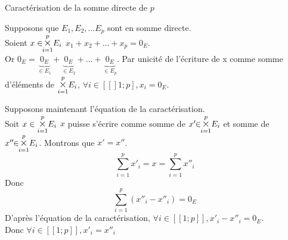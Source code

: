 \documentclass{article}
\renewenvironment{question_kholle}[2][ ]
{
	\subsection{\texorpdfstring{#2}{}}
	\notblank{#1}
	{
		\noindent #1
		\bigbreak
	}
	{}
	\begin{proof}
}
{
	\end{proof}
}
\begin{document}
		{Caractérisation de la somme directe de $p$ \sevs}

		Supposons que $E_1, E_2, \ldots E_p$ sont en somme directe. \\
		Soient $x \in \!\! \overset{p}{\underset{i=1}{\mathlarger{\mathlarger{\times}}}} E_i$ \fqs \tqs $x_1 + x_2 + \ldots + x_p = 0_E$. \\
		Or $0_E = \underbrace{0_E}_{\in E_1} + \underbrace{0_E}_{\in E_2} + \ldots + \underbrace{0_E}_{\in E_p}$.
		Par unicité de l'écriture de x comme somme d'éléments de $\overset{p}{\underset{i=1}{\mathlarger{\mathlarger{\times}}}} E_i$, $\forall i \in [\![]1;p\!], x_i = 0_E$.

		Supposons maintenant l'équation de la caractérisation. \\
		Soit $x \in \overset{p}{\underset{i=1}{\mathlarger{\mathlarger{\times}}}} E_i$ \tq $x$ puisse s'écrire comme somme de $x' \!\! \in \!\! \overset{p}{\underset{i=1}{\mathlarger{\mathlarger{\times}}}} E_i$ et somme de $x'' \!\! \in \!\! \overset{p}{\underset{i=1}{\mathlarger{\mathlarger{\times}}}} E_i$. Montrons que $x' = x''$.
		\begin{equation*}
			\sum_{i=1}^{p} x'_i = x = \sum_{i=1}^{p} x''_i
		\end{equation*}
		Donc
		\begin{equation*}
			\sum_{i=1}^{p} \left( x''_i -x''_i \right) = 0_E
		\end{equation*}
		D'après l'équation de la caractérisation, $\forall i \in [\![1;p]\!], x'_i - x''_i = 0_E$. \\
		Donc $\forall i \in [\![1;p]\!], x'_i = x''_i$
	\end{question_kholle}
\end{document}
